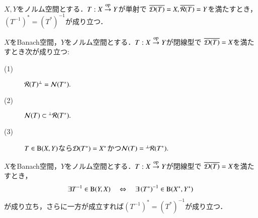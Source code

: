 	\begin{screen}
		\begin{thm}
			$X,Y$をノルム空間とする．$T:X \overset{\mathrm{op}}{\rightarrow} Y$が単射で
			$\closure{\Dom{T} } = X, \closure{\Ran{T} } = Y$を満たすとき，
			$\left( T^{-1} \right)^* = \left( T^* \right)^{-1}$が成り立つ．
		\end{thm}
	\end{screen}
	
	\begin{screen}
		\begin{lem}
			$X$をBanach空間，$Y$をノルム空間とする．$T:X \overset{\mathrm{op}}{\rightarrow} Y$が閉線型で
			$\closure{\Dom{T} } = X$を満たすとき次が成り立つ:
			\begin{description}
				\item[(1)] ${\mathcal{R}( T ) }^{\perp} = \mathcal{N}( T^* ) .$
				\item[(2)] $\mathcal{N}( T ) \subset {}^\perp \mathcal{R}( T^* ) .$
				\item[(3)] $T \in \mathrm{B}(X,Y) $なら$\Dom{T^*} = X^*$かつ$\mathcal{N}( T ) = {}^\perp \mathcal{R}( T^* ) .$
			\end{description}
		\end{lem}
	\end{screen}
	
	\begin{screen}
		\begin{thm}
			$X$をBanach空間，$Y$をノルム空間とする．$T:X \overset{\mathrm{op}}{\rightarrow} Y$が閉線型で
			$\closure{\Dom{T} } = X$を満たすとき，
			\begin{align}
				\exists T^{-1} \in \mathrm{B}(Y,X)
				\quad \Leftrightarrow \quad
				\exists \left( T^* \right)^{-1} \in \mathrm{B}(X^*,Y^*)
			\end{align}
			が成り立ち，さらに一方が成立すれば$\left( T^{-1} \right)^* = \left( T^* \right)^{-1}$が成り立つ．
		\end{thm}
	\end{screen}